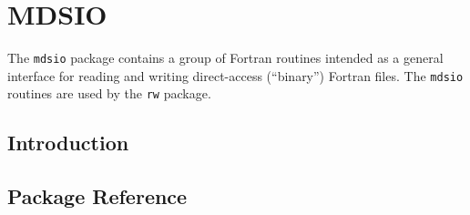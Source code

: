 

\section{MDSIO}
\label{sec:mdsio}
\label{sec:pkg:mdsio}

The \texttt{mdsio} package contains a group of Fortran routines
intended as a general interface for reading and writing direct-access
(``binary'') Fortran files.  The \texttt{mdsio} routines are used by
the \texttt{rw} package.

\subsection{Introduction}



\subsection{Package Reference}

